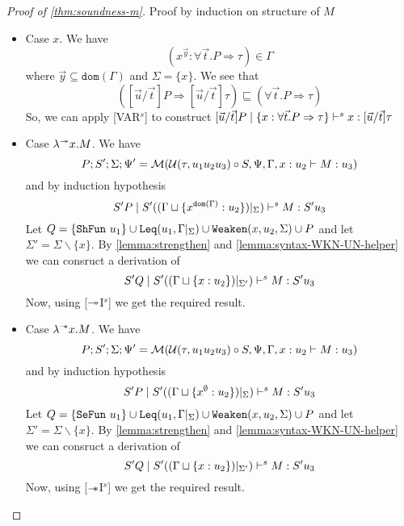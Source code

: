 \begin{proof}[Proof of \cref{thm:soundness-m}]
  Proof by induction on structure of $M$
  \begin{itemize}
  \item{Case $x$.}
    We have $$(x^{\vec{y}}:\forall \vec{t}. P \Rightarrow \tau) \in \Gamma$$ where $\vec{y} \subseteq \texttt{dom}(\Gamma)$ and $\Sigma = \{ x \}$. We see that
    $$([\vec{u}/\vec{t}]P \Rightarrow [\vec{u}/\vec{t}]\tau) \sqsubseteq (\forall \vec{t}. P \Rightarrow \tau)$$
    So, we can apply [VAR$^s$] to construct
    $[\vec{u}/\vec{t}]P \mid \{x:\forall \vec{t}. P \Rightarrow \tau \} \vdash^s x: [\vec{u}/\vec{t}]\tau$

  \item{Case $\lambda^{\twoheadrightarrow} x. M$.}
    We have $$P; S'; \Sigma; \Psi' = \mathcal{M}(\mathcal{U}(\tau, u_1 u_2 u_3) \circ S, \Psi, \Gamma, x:u_2 \vdash M: u_3)$$
    and by induction hypothesis $$S' P \mid S' ((\Gamma \sqcup \{ x^{\texttt{dom}(\Gamma)} : u_2 \})|_{\Sigma}) \vdash^s M : S' u_3$$
    Let $Q = \{\texttt{ShFun}\ u_1\} \cup \texttt{Leq}(u_1, \Gamma|_\Sigma) \cup \texttt{Weaken}(x, u_2, \Sigma) \cup P$
    and let $\Sigma' = \Sigma \backslash \{x\}$. By \cref{lemma:strengthen} and \cref{lemma:syntax-WKN-UN-helper} we can consruct a
    derivation of $$S' Q \mid S'  ((\Gamma \sqcup \{x:u_2\})|_{\Sigma'}) \vdash^s M: S' u_3$$
    Now, using [$\twoheadrightarrow$I$^s$] we get the required result.

  \item{Case $\lambda^{\mathrel{-\mkern-6mu*}} x. M$.}
    We have $$P; S'; \Sigma; \Psi' = \mathcal{M}(\mathcal{U}(\tau, u_1 u_2 u_3) \circ S, \Psi, \Gamma, x:u_2 \vdash M: u_3)$$
    and by induction hypothesis $$S' P \mid S' ((\Gamma \sqcup \{ x^\emptyset : u_2 \})|_{\Sigma}) \vdash^s M : S' u_3$$
    Let $Q = \{\texttt{SeFun}\ u_1\} \cup \texttt{Leq}(u_1, \Gamma|_\Sigma) \cup \texttt{Weaken}(x, u_2, \Sigma) \cup P$
    and let $\Sigma' = \Sigma \backslash \{x\}$. By \cref{lemma:strengthen} and \cref{lemma:syntax-WKN-UN-helper} we can consruct a
    derivation of $$S' Q \mid S'  ((\Gamma \sqcup \{x:u_2\})|_{\Sigma'}) \vdash^s M: S' u_3$$
    Now, using [$\mathrel{-\mkern-6mu*}$I$^s$] we get the required result.


\end{itemize}
\end{proof}

